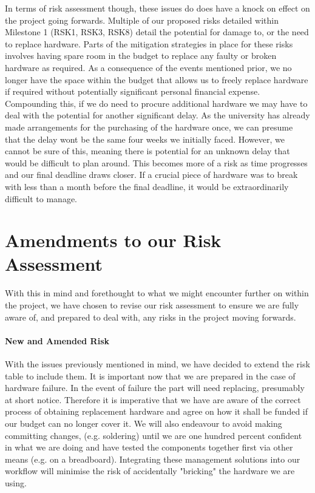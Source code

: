 In terms of risk assessment though, these issues do does have a knock on effect on the project going forwards. Multiple of our proposed risks detailed within Milestone 1\cite{coaker} (RSK1, RSK3, RSK8) detail the potential for damage to, or the need to replace hardware. Parts of the mitigation strategies in place for these risks involves having spare room in the budget to replace any faulty or broken hardware as required. As a consequence of the events mentioned prior, we no longer have the space within the budget that allows us to freely replace hardware if required without potentially significant personal financial expense. Compounding this, if we do need to procure additional hardware we may have to deal with the potential for another significant delay. As the university has already made arrangements for the purchasing of the hardware once, we can presume that the delay wont be the same four weeks we initially faced. However, we cannot be sure of this, meaning there is potential for an unknown delay that would be difficult to plan around. This becomes more of a risk as time progresses and our final deadline draws closer. If a crucial piece of hardware was to break with less than a month before the final deadline, it would be extraordinarily difficult to manage.

\section{Amendments to our Risk Assessment}
With this in mind and forethought to what we might encounter further on within the project, we have chosen to revise our risk assessment to ensure we are fully aware of, and prepared to deal with, any risks in the project moving forwards. 

\paragraph{New and Amended Risk}
With the issues previously mentioned in mind, we have decided to extend the risk table to include them. It is important now that we are prepared in the case of hardware failure. In the event of failure the part will need replacing, presumably at short notice. Therefore it is imperative that we have are aware of the correct process of obtaining replacement hardware and agree on how it shall be funded if our budget can no longer cover it. We will also endeavour to avoid making committing changes, (e.g. soldering) until we are one hundred percent confident in what we are doing and have tested the components together first via other means (e.g. on a breadboard). Integrating these management solutions into our workflow will minimise the risk of accidentally "bricking" the hardware we are using.

